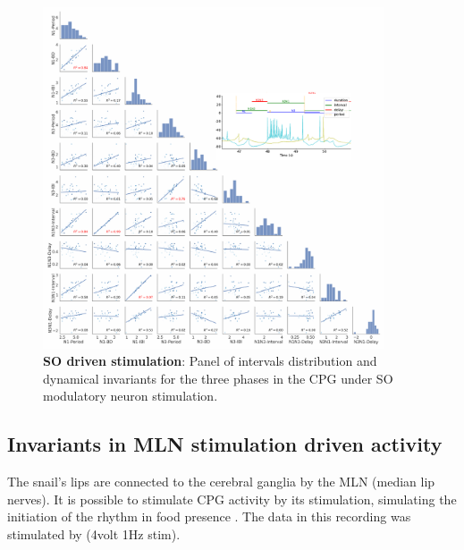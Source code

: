 \begin{figure}[htbp]
	\centering
	\includegraphics[width=0.9\textwidth]{./invariants/data/SUSSEX/SO_driven/images/panel_with_pairplot.pdf}
	\caption{\textbf{SO driven stimulation}: Panel of intervals distribution and dynamical invariants for the three phases in the CPG under SO modulatory neuron stimulation.}
	\label{fig:so stimulation pairplot}
\end{figure}



\subsection{Invariants in MLN stimulation driven activity}
The snail's lips are connected to the cerebral ganglia by the MLN (median lip nerves). It is possible to stimulate CPG activity by its stimulation, simulating the initiation of the rhythm in food presence \parencite{staras_electrophysiological_2019}. The data in this recording was stimulated by (4volt 1Hz stim).


